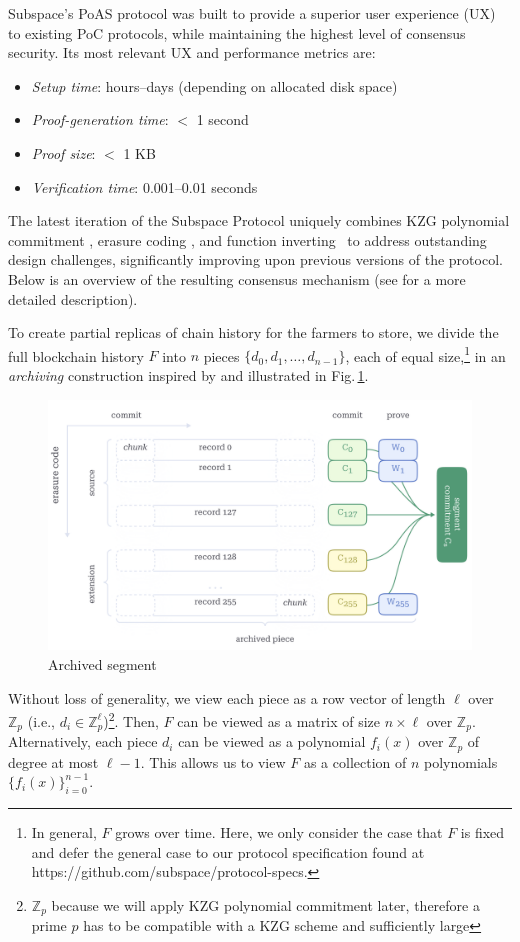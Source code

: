 \documentclass[conference]{IEEEtran}
\newcommand{\Fp}{\mathbb{Z}_p}
\begin{document}
Subspace's PoAS protocol was built to provide a superior user experience (UX) to existing PoC protocols, while maintaining the highest level of consensus security. Its most relevant UX and performance metrics are:
\begin{itemize}
    \item \textit{Setup time}: hours–days (depending on allocated disk space)
    \item \textit{Proof-generation time}: $<$ 1 second
    \item \textit{Proof size}: $<$ 1 KB
    \item \textit{Verification time}: 0.001–0.01 seconds
\end{itemize}
The latest iteration of the Subspace Protocol\cite{subspacev2} uniquely combines KZG polynomial commitment \cite{KZG_paper}, erasure coding \cite{erasure}, and function inverting~\cite{beyond_hellman} to address outstanding design challenges, significantly improving upon previous versions of the protocol\cite{subspacev1}. Below is an overview of the resulting consensus mechanism (see \cite{subspacev2} for a more detailed description).

To create partial replicas of chain history for the farmers to store, we divide the full blockchain history $F$ into $n$ pieces $\{ d_0, d_1, \ldots, d_{n-1}\}$, each of equal size,\footnote{In general, $F$ grows over time. Here, we only consider the case that $F$ is fixed and defer the general case to our protocol specification found at https://github.com/subspace/protocol-specs.} in an \textit{archiving} construction inspired by\cite{semiavidpr} and illustrated in Fig.\,\ref{fig:archiving}. 
\begin{figure}
    \centering
    \includegraphics[width=1\linewidth]{archived-segment.png}
\caption{Archived segment}
\label{fig:archiving}
\end{figure}
Without loss of generality, we view each piece as a row vector of length $\ell$ over $\Fp$ (i.e., $d_i \in \Fp^\ell$)\footnote{$\Fp$ because we will apply KZG polynomial commitment later, therefore a prime $p$ has to be compatible with a KZG scheme and sufficiently large}.
Then, $F$ can be viewed as a matrix of size $n \times \ell$ over $\Fp$.
Alternatively, each piece $d_i$ can be viewed as a polynomial $f_i(x)$ over $\Fp$ of degree at most $\ell - 1$. 
This allows us to view $F$ as a collection of $n$ polynomials $\{ f_i(x) \}_{i = 0}^{n-1}$.
\end{document}
